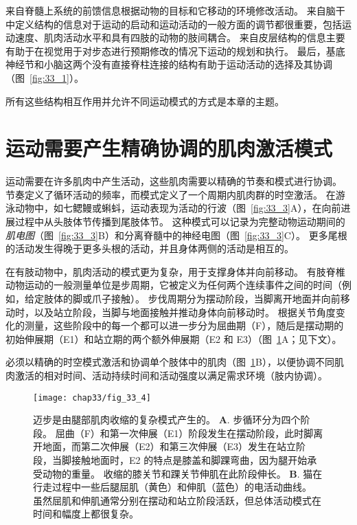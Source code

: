 来自脊髓上系统的前馈信息根据动物的目标和它移动的环境修改活动。
来自脑干中定义结构的信息对于运动的启动和运动活动的一般方面的调节都很重要，包括运动速度、肌肉活动水平和具有四肢的动物的肢间耦合。
来自皮层结构的信息主要有助于在视觉用于对步态进行预期修改的情况下运动的规划和执行。
最后，基底神经节和小脑这两个没有直接脊柱连接的结构有助于运动活动的选择及其协调（图~\ref{fig:33_1}）。


所有这些结构相互作用并允许不同运动模式的方式是本章的主题。



\section{运动需要产生精确协调的肌肉激活模式}

运动需要在许多肌肉中产生活动，这些肌肉需要以精确的节奏和模式进行协调。
节奏定义了循环活动的频率，而模式定义了一个周期内肌肉群的时空激活。
在游泳动物中，如七鳃鳗或蝌蚪，运动表现为活动的行波（图~\ref{fig:33_3}A），在向前进展过程中从头肢体节传播到尾肢体节。
这种模式可以记录为完整动物运动期间的\textit{肌电图}（图~\ref{fig:33_3}B）和分离脊髓中的神经电图（图~\ref{fig:33_3}C）。
更多尾根的活动发生得晚于更多头根的活动，并且身体两侧的活动是相互的。


在有肢动物中，肌肉活动的模式更为复杂，用于支撑身体并向前移动。
有肢脊椎动物运动的一般测量单位是步周期，它被定义为任何两个连续事件之间的时间（例如，给定肢体的脚或爪子接触）。
步伐周期分为摆动阶段，当脚离开地面并向前移动时，以及站立阶段，当脚与地面接触并推动身体向前移动时。
根据关节角度变化的测量，这些阶段中的每一个都可以进一步分为屈曲期（F），随后是摆动期的初始伸展期（E1）和站立期的两个额外伸展期（E2 和 E3）（图~\ref{fig:33_4}A；见下文）。


必须以精确的时空模式激活和协调单个肢体中的肌肉（图~\ref{fig:33_4}B），以便协调不同肌肉激活的相对时间、活动持续时间和活动强度以满足需求环境（肢内协调）。


\begin{figure}[htbp]
	\centering
	\texttt{[image: chap33/fig\_33\_4]}
	\caption{迈步是由腿部肌肉收缩的复杂模式产生的。
	\textbf{A}. 步循环分为四个阶段。
	屈曲（F）和第一次伸展（E1）阶段发生在摆动阶段，此时脚离开地面，而第二次伸展（E2）和第三次伸展（E3）发生在站立阶段，当脚接触地面时，E2 的特点是膝盖和脚踝弯曲，因为腿开始承受动物的重量。
	收缩的膝关节和踝关节伸肌在此阶段伸长\cite{engberg1969electromyographic}。
	\textbf{B}. 猫在行走过程中一些后腿屈肌（黄色）和伸肌（蓝色）的电活动曲线。
	虽然屈肌和伸肌通常分别在摆动和站立阶段活跃，但总体活动模式在时间和幅度上都很复杂。}
	\label{fig:33_4}
\end{figure}


